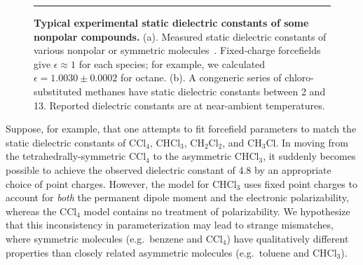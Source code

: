 \documentclass[aps,pre,twocolumn,nofootinbib,superscriptaddress,linenumbers]{revtex4-1}
\begin{document}
\begin{figure}


\noindent\rule{8cm}{0.4pt}


\caption{{\bf Typical experimental static dielectric constants of some nonpolar compounds.}
(a). Measured static dielectric constants of various nonpolar or symmetric molecules~\cite{d1990dielectric, haynes2011crc}.  
Fixed-charge forcefields give $\epsilon \approx 1$ for each species; for example, we calculated $\epsilon = 1.0030 \pm 0.0002$ for octane.
(b).  A congeneric series of chloro-substituted methanes have static dielectric constants between 2 and 13.  
Reported dielectric constants are at near-ambient temperatures.  
}
\label{figure:nonpolars}

\end{figure}


Suppose, for example, that one attempts to fit forcefield parameters to match the static dielectric constants of $\mathrm{CCl_4}$, $\mathrm{CHCl_3}$, $\mathrm{CH_2Cl_2}$, and $\mathrm{CH_3Cl}$.
In moving from the tetrahedrally-symmetric $\mathrm{CCl_4}$ to the asymmetric $\mathrm{CHCl_3}$, it suddenly becomes possible to achieve the observed dielectric constant of 4.8 by an appropriate choice of point charges.
However, the model for $\mathrm{CHCl_3}$ uses fixed point charges to account for \emph{both} the permanent dipole moment and the electronic polarizability, whereas the $\mathrm{CCl_4}$ model contains no treatment of polarizability.  
We hypothesize that this inconsistency in parameterization may lead to strange mismatches, where symmetric molecules (e.g.~benzene and $\mathrm{CCl_4}$) have qualitatively different properties than closely related asymmetric molecules (e.g.~toluene and $\mathrm{CHCl_3}$).
\end{document}
